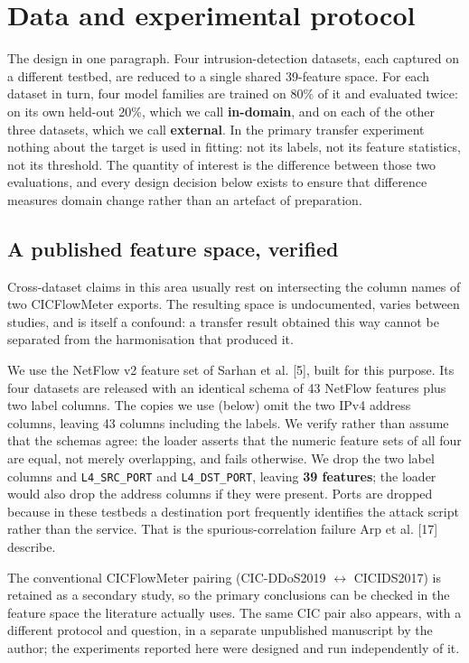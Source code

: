 \documentclass[preprint,12pt]{elsarticle}
\begin{document}
\section{Data and experimental protocol}

The design in one paragraph. Four intrusion-detection datasets, each captured on a different testbed, are reduced to a single shared 39-feature space. For each dataset in turn, four model families are trained on 80\% of it and evaluated twice: on its own held-out 20\%, which we call \textbf{in-domain}, and on each of the other three datasets, which we call \textbf{external}. In the primary transfer experiment nothing about the target is used in fitting: not its labels, not its feature statistics, not its threshold. The quantity of interest is the difference between those two evaluations, and every design decision below exists to ensure that difference measures domain change rather than an artefact of preparation.

\subsection{A published feature space, verified}

Cross-dataset claims in this area usually rest on intersecting the column names of two CICFlowMeter exports. The resulting space is undocumented, varies between studies, and is itself a confound: a transfer result obtained this way cannot be separated from the harmonisation that produced it.

We use the NetFlow v2 feature set of Sarhan et al. [5], built for this purpose. Its four datasets are released with an identical schema of 43 NetFlow features plus two label columns. The copies we use (below) omit the two IPv4 address columns, leaving 43 columns including the labels. We verify rather than assume that the schemas agree: the loader asserts that the numeric feature sets of all four are equal, not merely overlapping, and fails otherwise. We drop the two label columns and \texttt{L4\_SRC\_PORT} and \texttt{L4\_DST\_PORT}, leaving \textbf{39 features}; the loader would also drop the address columns if they were present. Ports are dropped because in these testbeds a destination port frequently identifies the attack script rather than the service. That is the spurious-correlation failure Arp et al. [17] describe.

The conventional CICFlowMeter pairing (CIC-DDoS2019 \ensuremath{\leftrightarrow} CICIDS2017) is retained as a secondary study, so the primary conclusions can be checked in the feature space the literature actually uses. The same CIC pair also appears, with a different protocol and question, in a separate unpublished manuscript by the author; the experiments reported here were designed and run independently of it.
\end{document}
